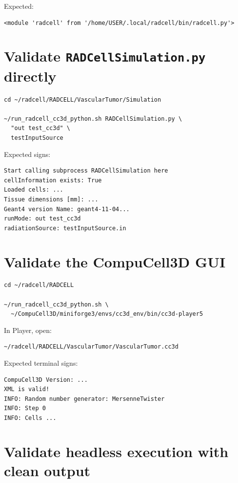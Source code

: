 \documentclass[11pt,a4paper,twoside,pdftex]{refrep}
\begin{document}
Expected:

\begin{lstlisting}
<module 'radcell' from '/home/USER/.local/radcell/bin/radcell.py'>
\end{lstlisting}

\section{Validate \texttt{RADCellSimulation.py} directly}

\begin{lstlisting}
cd ~/radcell/RADCELL/VascularTumor/Simulation

~/run_radcell_cc3d_python.sh RADCellSimulation.py \
  "out test_cc3d" \
  testInputSource
\end{lstlisting}

Expected signs:

\begin{lstlisting}
Start calling subprocess RADCellSimulation here
cellInformation exists: True
Loaded cells: ...
Tissue dimensions [mm]: ...
Geant4 version Name: geant4-11-04...
runMode: out test_cc3d
radiationSource: testInputSource.in
\end{lstlisting}

\section{Validate the CompuCell3D GUI}

\begin{lstlisting}
cd ~/radcell/RADCELL

~/run_radcell_cc3d_python.sh \
  ~/CompuCell3D/miniforge3/envs/cc3d_env/bin/cc3d-player5
\end{lstlisting}

In Player, open:

\begin{lstlisting}
~/radcell/RADCELL/VascularTumor/VascularTumor.cc3d
\end{lstlisting}

Expected terminal signs:

\begin{lstlisting}
CompuCell3D Version: ...
XML is valid!
INFO: Random number generator: MersenneTwister
INFO: Step 0
INFO: Cells ...
\end{lstlisting}

\section{Validate headless execution with clean output}
\end{document}
